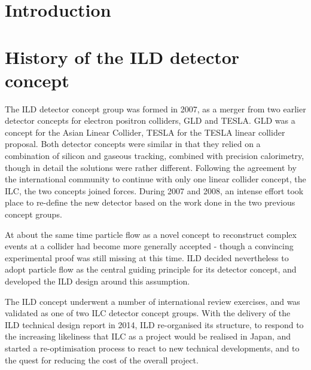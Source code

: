 \documentclass[%
 amsmath,amssymb,
 aps,
]{revtex4-1}
\begin{document}


\maketitle
\tableofcontents

\newpage

\section{\label{sec:level1}Introduction}

\section{History of the ILD detector concept}
The ILD detector concept group was formed in 2007, as a merger from two earlier detector concepts for electron positron colliders, GLD and TESLA. GLD was a concept for the Asian Linear Collider, TESLA for the TESLA linear collider proposal. Both detector concepts were similar in that they relied on a combination of silicon and gaseous tracking, combined with precision calorimetry, though in detail the solutions were rather different. Following the agreement by the international community to continue with only one linear collider concept, the ILC, the two concepts joined forces. During 2007 and 2008, an intense effort took place to re-define the new detector based on the work done in the two previous concept groups. 

At about the same time particle flow as a novel concept to reconstruct complex events at a collider had become more generally accepted - though a convincing experimental proof was still missing at this time. ILD decided nevertheless to adopt particle flow as the central guiding principle for its detector concept, and developed the ILD design around this assumption. 

The ILD concept underwent a number of international review exercises, and was validated as one of two ILC detector concept groups. With the delivery of the ILD technical design report in 2014, ILD re-organised its structure, to respond to the increasing likeliness that ILC as a project would be realised in Japan, and started a re-optimisation process to react to new technical developments, and to the quest for reducing the cost of the overall project. 
\end{document}
